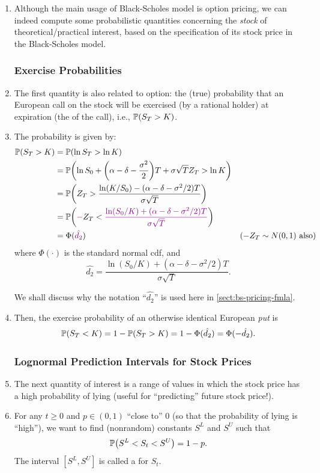 \begin{enumerate}
\item Although the main usage of Black-Scholes model is option pricing, we can
indeed compute some probabilistic quantities concerning the \emph{stock}
 of theoretical/practical interest, based on the
specification of its stock price in the Black-Scholes model.
\subsubsection*{Exercise Probabilities}
\item The first quantity is also related to option: the (true) probability that
an European call on the stock  will be exercised (by a
rational holder) at expiration (the  of the call),
i.e.,
\(\mathbb{P}\qty(S_T>K)\).
\item \label{it:bs-exercise-prob-fmla}
The probability is given by:
\begin{align*}
\prob{S_T>K}&=\prob{\ln S_T>\ln K}\\
&=\prob{\ln S_0+\qty(\alpha-\delta-\frac{\sigma^2}{2})T+\sigma\sqrt{T}Z_T>\ln K}\\
&=\prob{Z_T>\frac{\ln(K/S_0)-(\alpha-\delta-\sigma^2/2)T}{\sigma\sqrt{T}}}\\
&=\prob{{\color{Maroon}-}Z_T<{\color{violet}\frac{\ln(S_0/K)+(\alpha-\delta-\sigma^2/2)T}{\sigma\sqrt{T}}}}\\
&=\Phi({\color{violet}\hat{d_2}})&(-Z_T\sim N(0,1)\text{ also})
\end{align*}
where \(\Phi(\cdot)\) is the standard normal cdf, and 
\[
\text{\(\hat{d_2}\)}=\frac{\ln(S_0/K)+(\alpha-\delta-\sigma^2/2)T}{\sigma\sqrt{T}}.
\]
\begin{note}
We shall discuss why the notation ``\(\hat{d_2}\)'' is used here in
\cref{sect:bs-pricing-fmla}.
\end{note}
\item Then, the exercise probability of an otherwise identical European
\emph{put} is
\[
\mathbb{P}\qty(S_T<K)=1-\mathbb{P}\qty(S_T>K)=1-\Phi(\hat{d_2})=\Phi(-\hat{d_2}).
\]
\subsubsection*{Lognormal Prediction Intervals for Stock Prices}
\item The next quantity of interest is a range of values in which the stock
price has a high probability of lying (useful for ``predicting'' future stock
price!).
\item For any \(t\ge 0\) and \(p\in (0,1)\) ``close to'' 0 (so that the
probability of lying is ``high''), we want to find (nonrandom) constants
\(S^L\) and \(S^U\) such that
\[
\mathbb{P}\qty(S^L<S_t<S^U)=1-p.
\]
The interval \([S^L,S^U]\) is called a  for \(S_t\).


\end{enumerate}

